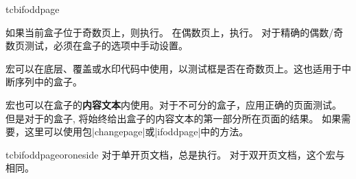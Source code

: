   

\begin{docCommand}[doc new=2015-11-13]{tcbifoddpage}{}
  
  如果当前盒子位于奇数页上，则执行。%
  在偶数页上，执行。%
  对于精确的偶数/奇数页测试，必须在盒子的选项中手动设置。
  
  宏可以在底层、覆盖或水印代码中使用，以测试框是否在奇数页上。这也适用于中断序列中的盒子。
  
  宏也可以在盒子的\textbf{内容文本}内使用。对于不可分的盒子，应用正确的页面测试。%
  但是对于的盒子, 将始终给出盒子的内容文本的第一部分所在页面的结果。 如果需要，这里可以使用包|changepage|或|ifoddpage|中的方法。
  
  \begin{dispExample}
  
  \begin{tcolorbox}[enhanced,check odd page,
    title={Example for a box on an \tcbifoddpage{odd}{even} page},
    watermark text={\tcbifoddpage{Odd}{Even} page!}]
  \lipsum[1]
  \end{tcolorbox}
  \end{dispExample}
  \end{docCommand}

  


\begin{docCommand}[doc new=2016-11-18]{tcbifoddpageoroneside}{}
对于单开页文档，总是执行。%
对于双开页文档，这个宏与相同。
\end{docCommand}


